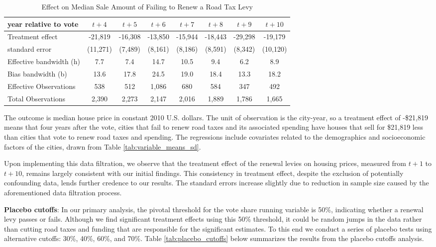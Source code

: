 \begin{table}[ht]
    \centering
    \caption{Effect on Median Sale Amount of Failing to Renew a Road Tax Levy}
    \label{tab:uncontaminated}
    \begin{tabular}{p{2.8cm}ccccccc}
        \hline
        year relative to vote & $t + 4$ & $t + 5$ & $t + 6$ & $t + 7$ & $t + 8$ & $t + 9$ & $t + 10$ \\
        \hline
        Treatment effect & -21,819 & -16,308 & -13,850 & -15,944 & -18,443 & -29,298 & -19,179 \\
        standard error & (11,271) & (7,489) & (8,161) & (8,186) & (8,591) & (8,342) & (10,120) \\
        Effective bandwidth (h) & 7.7 & 7.4 & 14.7 & 10.5 & 9.4 & 6.2 & 8.9 \\
        Bias bandwidth (b) & 13.6 & 17.8 & 24.5 & 19.0 & 18.4 & 13.3 & 18.2 \\
        Effective Observations & 538 & 512 & 1,086 & 680 & 584 & 347 & 492 \\
        Total Observations & 2,390 & 2,273 & 2,147 & 2,016 & 1,889 & 1,786 & 1,665 \\
        \hline
    \end{tabular}
    \begin{tablenotes}
        \small
        \item The outcome is median house price in constant 2010 U.S. dollars. The unit of observation is the city-year, so a treatment effect of -\$21,819 means that four years after the vote, cities that fail to renew road taxes and its associated spending have houses that sell for \$21,819 less than cities that vote to renew road taxes and spending. The regressions include covariates related to the demographics and socioeconomic factors of the cities, drawn from Table \ref{tab:variable_means_sd}.
    \end{tablenotes}
\end{table}

Upon implementing this data filtration, we observe that the treatment effect of the renewal levies on housing prices, measured from $t+1$ to $t+10$, remains largely consistent with our initial findings. This consistency in treatment effect, despite the exclusion of potentially confounding data, lends further credence to our results. The standard errors increase slightly due to reduction in sample size caused by the aforementioned data filtration process. 

\textbf{Placebo cutoffs}: In our primary analysis, the pivotal threshold for the vote share running variable is 50\%, indicating whether a renewal levy passes or fails.  Although we find significant treatment effects using this 50\% threshold, it could be random jumps in the data rather than cutting road taxes and funding that are responsible for the significant estimates.  To this end we conduct a series of placebo tests using alternative cutoffs: 30\%, 40\%, 60\%, and 70\%. Table \ref{tab:placebo_cutoffs} below summarizes the results from the placebo cutoffs analysis. 

